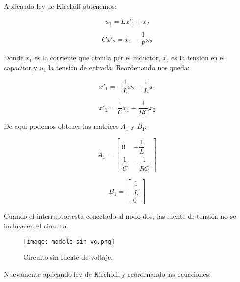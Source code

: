 Aplicando ley de Kirchoff obtenemos:

\vspace{-0.5cm}
\begin{equation}
    u_1 = Lx'_1 + x_2
\end{equation}

\vspace{-0.5cm}
\begin{equation}
    Cx'_2 = x_1 - \dfrac{1}{R} x_2 
\end{equation}

Donde $x_1$ es la corriente que circula por el inductor, $x_2$ es la tensión en el capacitor y $u_1$ la tensión de entrada.
Reordenando nos queda:

\vspace{-0.5cm}
\begin{equation}
    x'_1 = -\dfrac{1}{L} x_2 + \dfrac{1}{L} u_1
\end{equation}

\vspace{-0.5cm}
\begin{equation}
    x'_2 = \dfrac{1}{C}x_1 - \dfrac{1}{RC} x_2 
\end{equation}

De aqui podemos obtener las matrices $A_1$ y $B_1$:

\begin{equation}
    A_1 = \begin{bmatrix}
        0 & -\dfrac{1}{L}\\
        \dfrac{1}{C} & -\dfrac{1}{RC}
    \end{bmatrix}
\end{equation}

\begin{equation}
    B_1 = \begin{bmatrix}
        \dfrac{1}{L}\\
        0
    \end{bmatrix}
\end{equation}

Cuando el interruptor esta conectado al nodo dos, las fuente de tensión 
no se incluye en el circuito.

\begin{figure}[H]
    \centering
    \texttt{[image: modelo\_sin\_vg.png]}
    \vspace{-0.25cm}
    \caption{Circuito sin fuente de voltaje.}
    \label{fig:modelado_sin_vg}
\end{figure}

Nuevamente aplicando ley de Kirchoff, y reordenando las ecuaciones:

